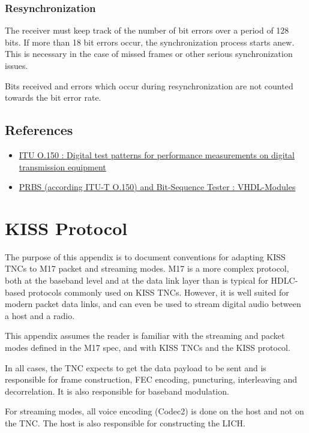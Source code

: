 \documentclass[a4paper,11pt,oneside]{book}
\begin{document}
\subsection{Resynchronization}

The receiver must keep track of the number of bit errors over a period of 128 bits. If more than 18 bit errors occur, the synchronization process starts anew. This is necessary in the case of missed frames or other serious synchronization issues.

Bits received and errors which occur during resynchronization are not counted towards the bit error rate.

\section{References}

\begin{itemize}
	\item
	\href{http://www.itu.int/rec/T-REC-O.150-199210-S}{ITU O.150 : Digital 	test patterns for performance measurements on digital transmission 	equipment}
	\item
	\href{http://www.pldworld.com/_hdl/5/-thorsten-gaertner.de/vhdl/PRBS.pdf}{PRBS
	(according ITU-T O.150) and Bit-Sequence Tester : VHDL-Modules}
\end{itemize}

\chapter{KISS Protocol}

The purpose of this appendix is to document conventions for adapting KISS TNCs to M17 packet and streaming modes. M17 is a more complex protocol, both at the baseband level and at the data link layer than is typical for HDLC-based protocols commonly used on KISS TNCs. However, it is well suited for modern packet data links, and can even be used to stream digital audio between a host and a radio.

This appendix assumes the reader is familiar with the streaming and packet modes defined in the M17 spec, and with KISS TNCs and the KISS protocol.

In all cases, the TNC expects to get the data payload to be sent and is responsible for frame construction, FEC encoding, puncturing, interleaving and decorrelation. It is also responsible for baseband modulation.

For streaming modes, all voice encoding (Codec2) is done on the host and not on the TNC. The host is also responsible for constructing the LICH.
\end{document}
